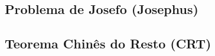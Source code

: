 % 

% 

\subsection{Problema de Josefo (Josephus)}


% 

% 

% 

% 

% 

\subsection{Teorema Chinês do Resto (CRT)}


